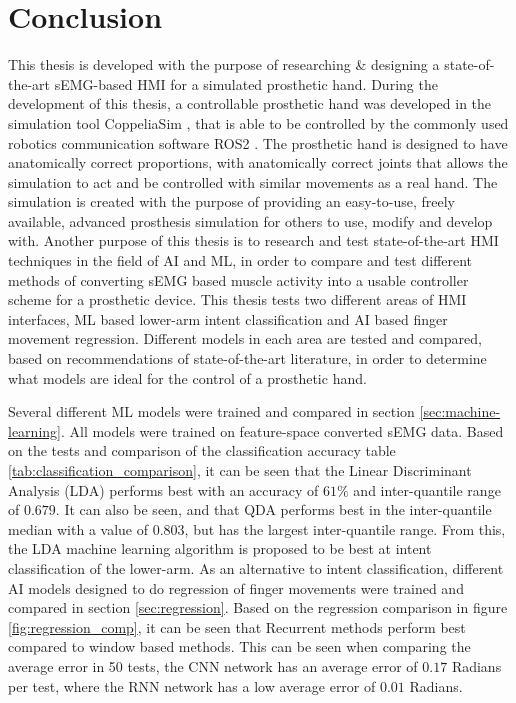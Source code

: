 \documentclass[../main.tex]{subfiles}
\begin{document}
\section{Conclusion}

This thesis is developed with the purpose of researching \& designing a state-of-the-art sEMG-based HMI for a simulated prosthetic hand.
During the development of this thesis, a controllable prosthetic hand was developed in the simulation tool CoppeliaSim \cite{coppeliasim}, that is able to be controlled by the commonly used robotics communication software ROS2 \cite{ros2}.
The prosthetic hand is designed to have anatomically correct proportions, with anatomically correct joints that allows the simulation to act and be controlled with similar movements as a real hand. 
The simulation is created with the purpose of providing an easy-to-use, freely available, advanced prosthesis simulation for others to use, modify and develop with. 
Another purpose of this thesis is to research and test state-of-the-art HMI techniques in the field of AI and ML, in order to compare and test different methods of converting sEMG based muscle activity into a usable controller scheme for a prosthetic device.
This thesis tests two different areas of HMI interfaces, ML based lower-arm intent classification and AI based finger movement regression.
Different models in each area are tested and compared, based on recommendations of state-of-the-art
literature, in order to determine what models are ideal for the control of a prosthetic hand.

Several different ML models were trained and compared in section \ref{sec:machine-learning}.
All models were trained on feature-space converted sEMG data.
Based on the tests and comparison of the classification accuracy table \ref{tab:classification_comparison}, it can be seen that the Linear Discriminant Analysis (LDA) performs best with an accuracy of $61\%$ and inter-quantile range of $0.679$.
It can also be seen, and that QDA performs best in the inter-quantile median with a value of $0.803$, but has the largest inter-quantile range.
From this, the LDA machine learning algorithm is proposed to be best at intent classification of the lower-arm.
As an alternative to intent classification, different AI models designed to do regression of finger movements were trained and compared in section \ref{sec:regression}.
Based on the regression comparison in figure \ref{fig:regression_comp}, it can be seen that Recurrent methods perform best compared to window based methods.
This can be seen when comparing the average error in 50 tests, the CNN network has an average error of $0.17$ Radians per test, where the RNN network has a low average error of $0.01$ Radians.
\end{document}
